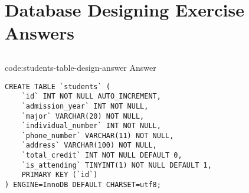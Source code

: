 \section{Database Designing Exercise Answers}\label{sect:database-designing-answers}

\subsection*{}

\begin{codeenv}{code:students-table-design-answer}{ Answer}\begin{verbatim}
CREATE TABLE `students` (
    `id` INT NOT NULL AUTO_INCREMENT,
    `admission_year` INT NOT NULL,
    `major` VARCHAR(20) NOT NULL,
    `individual_number` INT NOT NULL,
    `phone_number` VARCHAR(11) NOT NULL,
    `address` VARCHAR(100) NOT NULL,
    `total_credit` INT NOT NULL DEFAULT 0,
    `is_attending` TINYINT(1) NOT NULL DEFAULT 1,
    PRIMARY KEY (`id`)
) ENGINE=InnoDB DEFAULT CHARSET=utf8;
\end{verbatim}
\end{codeenv}

\subsection*{}

